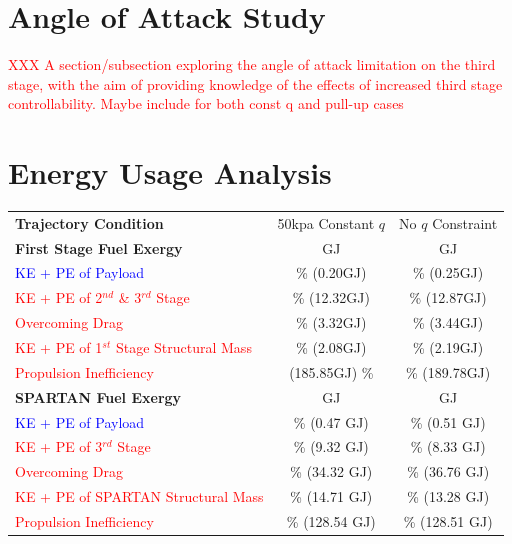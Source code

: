 \section{Angle of Attack Study}
\textcolor{red}{XXX A section/subsection exploring the angle of attack limitation on the third stage, with the aim of providing knowledge of the effects of increased third stage controllability. Maybe include for both const q and pull-up cases}

\section{Energy Usage Analysis}\label{sec:exergy1}


\begin{table}[ht]
	\centering
	\begin{tabular}{l c c} 
		\hline \textbf{Trajectory Condition}
		&50kpa Constant $q$
		&No $q$ Constraint
		\\
		\textbf{First Stage Fuel Exergy} 
		&\textbf{\firstEnergyConstqNoReturn} GJ
		&\textbf{\firstEnergyStandardNoReturn} GJ
		\\
		
		\textcolor{blue}{KE + PE of Payload}
		& \firstWpayloadConstqNoReturn \% (0.20GJ)
		& \firstWpayloadStandardNoReturn \% (0.25GJ)
		\\
		\textcolor{red}{KE + PE of  2$^{nd}$ \& 3$^{rd}$ Stage}
		& \firstWnextStageConstqNoReturn \% (12.32GJ) & \firstWnextStageStandardNoReturn \% (12.87GJ)
		\\
		
		\textcolor{red}{Overcoming Drag} 
		& \WDoneConstqNoReturn \% (3.32GJ) & \WDoneStandardNoReturn \% (3.44GJ)
		\\
		\textcolor{red}{KE + PE of 1$^{st}$ Stage Structural Mass} 
		& \WoneConstqNoReturn \% (2.08GJ) & \WoneStandardNoReturn \% (2.19GJ)
		\\ 
		\textcolor{red}{Propulsion Inefficiency} 
		& \PlossoneCombinedConstqNoReturn (185.85GJ) \% & \PlossoneCombinedStandardNoReturn \% (189.78GJ)
		\\ 
		\textbf{SPARTAN Fuel Exergy} 
		& \textbf{\secondEnergyConstqNoReturn} GJ & \textbf{\secondEnergyStandardNoReturn} GJ
		\\
		\textcolor{blue}{KE + PE of Payload}
		& \secondWpayloadConstqNoReturn \% (0.47 GJ) & \secondWpayloadStandardNoReturn \% (0.51 GJ) 
		\\
		\textcolor{red}{KE + PE of 3$^{rd}$ Stage}
		& \secondWnextStageConstqNoReturn \% (9.32 GJ) & \secondWnextStageStandardNoReturn \% (8.33 GJ)
		\\
		\textcolor{red}{Overcoming Drag}
		& \WDsecondConstqNoReturn \% (34.32 GJ) & \WDsecondStandardNoReturn \% (36.76 GJ)
		\\
		\textcolor{red}{KE + PE of SPARTAN Structural Mass}  
		& \WsecondConstqNoReturn \% (14.71 GJ) & \WsecondStandardNoReturn \% (13.28 GJ)
		\\
		\textcolor{red}{Propulsion Inefficiency}  
		& \PlosssecondCombinedConstqNoReturn \% (128.54 GJ) & \PlosssecondCombinedStandardNoReturn \% (128.51 GJ)
		\\
		

\end{tabular}
\end{table}
